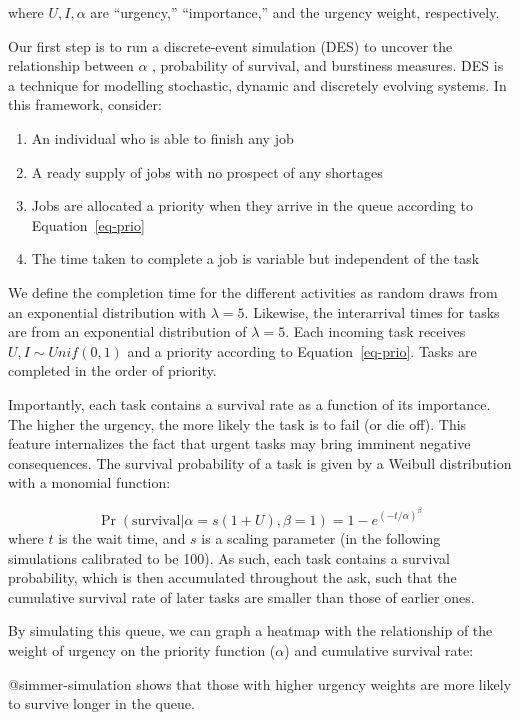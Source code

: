 where \(U, I, \alpha\) are ``urgency,'' ``importance,'' and the urgency
weight, respectively.

Our first step is to run a discrete-event simulation (DES) to uncover
the relationship between \(\alpha\) , probability of survival, and
burstiness measures. DES is a technique for modelling stochastic,
dynamic and discretely evolving systems. In this framework, consider:

\begin{enumerate}
\def\labelenumi{\arabic{enumi}.}
\item
  An individual who is able to finish any job
\item
  A ready supply of jobs with no prospect of any shortages
\item
  Jobs are allocated a priority when they arrive in the queue according
  to Equation~\ref{eq-prio}
\item
  The time taken to complete a job is variable but independent of the
  task
\end{enumerate}

We define the completion time for the different activities as random
draws from an exponential distribution with \(\lambda = 5\). Likewise,
the interarrival times for tasks are from an exponential distribution of
\(\lambda = 5\). Each incoming task receives \(U, I \sim Unif(0,1)\) and
a priority according to Equation~\ref{eq-prio}. Tasks are completed in
the order of priority.

Importantly, each task contains a survival rate as a function of its
importance. The higher the urgency, the more likely the task is to fail
(or die off). This feature internalizes the fact that urgent tasks may
bring imminent negative consequences. The survival probability of a task
is given by a Weibull distribution with a monomial function:

\[
\Pr (\text{survival}|\alpha = s(1+U),\beta=1) = 1 - e^{(-t/\alpha)^\beta}
\] where \(t\) is the wait time, and \(s\) is a scaling parameter (in
the following simulations calibrated to be 100). As such, each task
contains a survival probability, which is then accumulated throughout
the ask, such that the cumulative survival rate of later tasks are
smaller than those of earlier ones.

By simulating this queue, we can graph a heatmap with the relationship
of the weight of urgency on the priority function (\(\alpha\)) and
cumulative survival rate:

@simmer-simulation shows that those with higher urgency weights are more
likely to survive longer in the queue.

